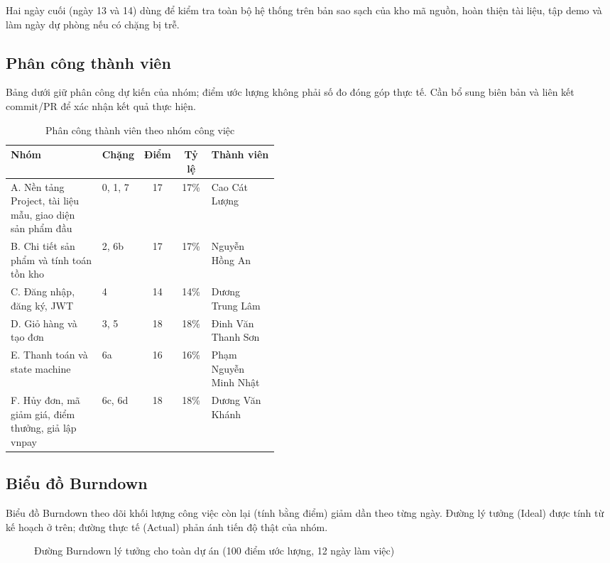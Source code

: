 \documentclass[a4paper]{article}
\begin{document}
Hai ngày cuối (ngày 13 và 14) dùng để kiểm tra toàn bộ hệ thống trên bản sao sạch của kho mã nguồn, hoàn thiện tài liệu, tập demo và làm ngày dự phòng nếu có chặng bị trễ.

\subsection{Phân công thành viên}
Bảng dưới giữ phân công dự kiến của nhóm; điểm ước lượng không phải số đo đóng góp thực tế. Cần bổ sung biên bản và liên kết commit/PR để xác nhận kết quả thực hiện.
\begin{table}[h!]
\centering
\footnotesize
\begin{tabularx}{\textwidth}{|p{0.34\linewidth}|p{0.10\linewidth}|c|c|X|}
\hline
\textbf{Nhóm} & \textbf{Chặng} & \textbf{Điểm} & \textbf{Tỷ lệ} & \textbf{Thành viên} \\ \hline
A. Nền tảng Project, tài liệu mẫu, giao diện sản phẩm đầu & 0, 1, 7 & 17 & 17\% & Cao Cát Lượng \\ \hline
B. Chi tiết sản phẩm và tính toán tồn kho & 2, 6b & 17 & 17\% & Nguyễn Hồng An \\ \hline
C. Đăng nhập, đăng ký, JWT & 4 & 14 & 14\% & Dương Trung Lâm \\ \hline
D. Giỏ hàng và tạo đơn & 3, 5 & 18 & 18\% & Đinh Văn Thanh Sơn \\ \hline
E. Thanh toán và state machine & 6a & 16 & 16\% & Phạm Nguyễn Minh Nhật \\ \hline
F. Hủy đơn, mã giảm giá, điểm thưởng, giả lập vnpay & 6c, 6d & 18 & 18\% & Dương Văn Khánh \\ \hline
\end{tabularx}
\caption{Phân công thành viên theo nhóm công việc}
\end{table}

\subsection{Biểu đồ Burndown}
Biểu đồ Burndown theo dõi khối lượng công việc còn lại (tính bằng điểm) giảm dần theo từng ngày. Đường lý tưởng (Ideal) được tính từ kế hoạch ở trên; đường thực tế (Actual) phản ánh tiến độ thật của nhóm.

\begin{figure}[h!]
\centering
{}
\caption{Đường Burndown lý tưởng cho toàn dự án (100 điểm ước lượng, 12 ngày làm việc)}
\end{figure}
\end{document}
